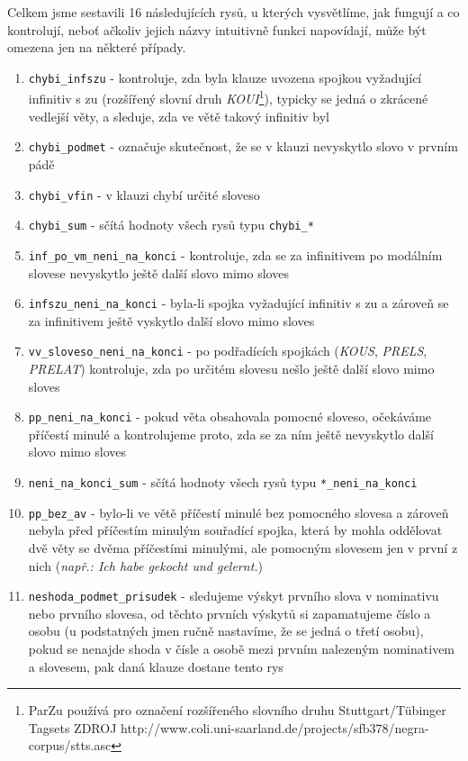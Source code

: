 \documentclass[12pt,a4paper]{report}
\begin{document}
Celkem jsme sestavili 16 následujících rysů, u kterých vysvětlíme, jak fungují a co kontrolují, neboť ačkoliv jejich názvy intuitivně funkci napovídají, může být omezena jen na některé případy.
\begin{enumerate}
\item{\texttt{chybi\_infszu} - kontroluje, zda byla klauze uvozena spojkou vyžadující infinitiv s zu (rozšířený slovní druh \textit{KOUI}\footnote{ParZu používá pro označení rozšířeného slovního druhu Stuttgart/Tübinger Tagsets ZDROJ http://www.coli.uni-saarland.de/projects/sfb378/negra-corpus/stts.asc}), typicky se jedná o zkrácené vedlejší věty, a sleduje, zda ve větě takový infinitiv byl}
\item{\texttt{chybi\_podmet} - označuje skutečnost, že se v klauzi nevyskytlo slovo v prvním pádě}
\item{\texttt{chybi\_vfin} - v klauzi chybí určité sloveso}
\item{\texttt{chybi\_sum} - sčítá hodnoty všech rysů typu \texttt{chybi\_*}}
\item{\texttt{inf\_po\_vm\_neni\_na\_konci} - kontroluje, zda se za infinitivem po modálním slovese nevyskytlo ještě další slovo mimo sloves}
\item{\texttt{infszu\_neni\_na\_konci} - byla-li spojka vyžadující infinitiv s zu a zároveň se za infinitivem ještě vyskytlo další slovo mimo sloves}
\item{\texttt{vv\_sloveso\_neni\_na\_konci} - po podřadících spojkách (\textit{KOUS}, \textit{PRELS}, \textit{PRELAT}) kontroluje, zda po určitém slovesu nešlo ještě další slovo mimo sloves}
\item{\texttt{pp\_neni\_na\_konci} - pokud věta obsahovala pomocné sloveso, očekáváme příčestí minulé a kontrolujeme proto, zda se za ním ještě nevyskytlo další slovo mimo sloves}
\item{\texttt{neni\_na\_konci\_sum} - sčítá hodnoty všech rysů typu \texttt{*\_neni\_na\_konci}}
\item{\texttt{pp\_bez\_av} - bylo-li ve větě příčestí minulé bez pomocného slovesa a zároveň nebyla před příčestím minulým souřadící spojka, která by mohla oddělovat dvě věty se dvěma příčestími minulými, ale pomocným slovesem jen v první z nich (\textit{např.: Ich habe gekocht und gelernt.})}
\item{\texttt{neshoda\_podmet\_prisudek} - sledujeme výskyt prvního slova v nominativu nebo prvního slovesa, od těchto prvních výskytů si zapamatujeme číslo a osobu (u podstatných jmen ručně nastavíme, že se jedná o třetí osobu), pokud se nenajde shoda v čísle a osobě mezi prvním nalezeným nominativem a slovesem, pak daná klauze dostane tento rys}

\end{enumerate}
\end{document}
